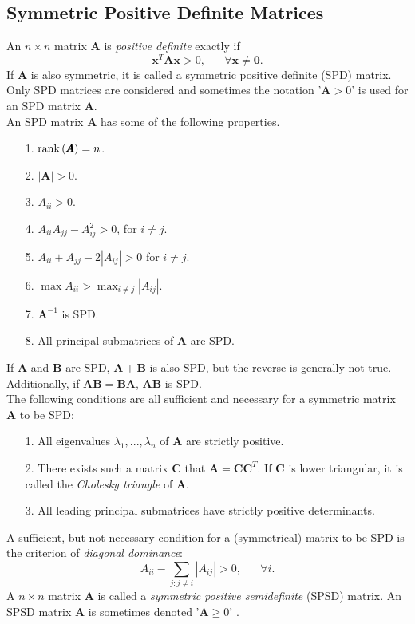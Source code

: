 \subsection{Symmetric Positive Definite Matrices}
An $n \times n$ matrix $\pmb{A}$ is \textit{positive definite} exactly if
\begin{equation*}
    \pmb{x}^T\pmb{A}\pmb{x}>0,\hspace{20pt}\forall\pmb{x}\neq\pmb{0}.
\end{equation*}
If $\pmb{A}$ is also symmetric, it is called a symmetric positive definite (SPD) matrix. Only SPD matrices are considered and sometimes the notation '$\pmb{A}>0$' is used for an SPD matrix $\pmb{A}$. \\
An SPD matrix $\pmb{A}$ has some of the following properties.
\begin{itemize}
    \item[1.] $\hbox{rank}\left(\pmb{A}\right)=n$.
    \item[2.] $|\pmb{A}|>0$.
    \item[3.] $A_{ii}>0$.
    \item[4.] $A_{ii}A_{jj}-A_{ij}^2>0$, for $i\neq j$.
    \item[5.] $A_{ii} + A_{jj}-2|A_{ij}|>0$ for $i\neq j$.
    \item[6.] $\max A_{ii}>\max_{i\neq j}|A_{ij}|$.
    \item[7.] $\pmb{A}^{-1}$ is SPD.
    \item[8.] All principal submatrices of $\pmb{A}$ are SPD.
\end{itemize}
If $\pmb{A}$ and $\pmb{B}$ are SPD, $\pmb{A}+\pmb{B}$ is also SPD, but the reverse is generally not true. Additionally, if $\pmb{AB}=\pmb{BA}$, $\pmb{AB}$ is SPD. \\
The following conditions are all sufficient and necessary for a symmetric matrix $\pmb{A}$ to be SPD:
\begin{itemize}
    \item[1.] All eigenvalues $\lambda_1,...,\lambda_n$ of $\pmb{A}$ are strictly positive.
    \item[2.] There exists such a matrix $\pmb{C}$ that $\pmb{A}=\pmb{CC}^T$. If $\pmb{C}$ is lower triangular, it is called the \textit{Cholesky triangle} of $\pmb{A}$.
    \item[3.] All leading principal submatrices have strictly positive determinants.
\end{itemize}    
A sufficient, but not necessary condition for a (symmetrical) matrix to be SPD is the criterion of \textit{diagonal dominance}:
    \begin{equation*}
        A_{ii}-\sum_{j:j\neq i}|A_{ij}|>0,\hspace{20pt}\forall i.
    \end{equation*}
    A $n\times n$ matrix $\pmb{A}$ is called a \textit{symmetric positive semidefinite} (SPSD) matrix. An SPSD matrix $\pmb{A}$ is sometimes denoted '$\pmb{A}\geq0$' \autocite[][18--19]{rue2005gaussian}.
\clearpage
